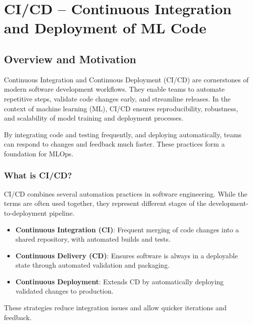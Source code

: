 \chapter{CI/CD -- Continuous Integration and Deployment of ML Code}

%
\section{Overview and Motivation}
Continuous Integration and Continuous Deployment (CI/CD) are cornerstones of modern software development workflows. They enable teams to automate repetitive steps, validate code changes early, and streamline releases. In the context of machine learning (ML), CI/CD ensures reproducibility, robustness, and scalability of model training and deployment processes.

By integrating code and testing frequently, and deploying automatically, teams can respond to changes and feedback much faster. These practices form a foundation for MLOps.

%
\subsection{What is CI/CD?}
CI/CD combines several automation practices in software engineering. While the terms are often used together, they represent different stages of the development-to-deployment pipeline.

\begin{itemize}
\item \textbf{Continuous Integration (CI)}: Frequent merging of code changes into a shared repository, with automated builds and tests.
\item \textbf{Continuous Delivery (CD)}: Ensures software is always in a deployable state through automated validation and packaging.
\item \textbf{Continuous Deployment}: Extends CD by automatically deploying validated changes to production.
\end{itemize}

These strategies reduce integration issues and allow quicker iterations and feedback.


